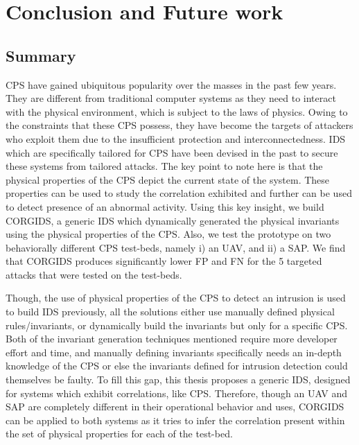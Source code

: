 
\chapter{\textbf{Conclusion and Future work}}
\label{sec8:Conclusion}

\section{Summary}

\ac{CPS} have gained ubiquitous popularity over the masses in the past few years. They are different from traditional computer systems as they need to interact with the physical environment, which is subject to the laws of physics. Owing to the constraints that these \ac{CPS} possess, they have become the targets of attackers who exploit them due to the insufficient protection and interconnectedness. \ac{IDS} which are specifically tailored for \ac{CPS} have been devised in the past to secure these systems from tailored attacks. The key point to note here is that the physical properties of the \ac{CPS} depict the current state of the system. These properties can be used to study the correlation exhibited and further can be used to detect presence of an abnormal activity. Using this key insight, we build \acf{CORGIDS}, a generic \ac{IDS} which dynamically generated the physical invariants using the physical properties of the \ac{CPS}. Also, we test the prototype on two behaviorally different \ac{CPS} test-beds, namely i) an \ac{UAV}, and ii) a \acf{SAP}. We find that \ac{CORGIDS} produces significantly lower \ac{FP} and \ac{FN} for the 5 targeted attacks that were tested on the test-beds.

Though, the use of physical properties of the \ac{CPS} to detect an intrusion is used to build \ac{IDS} previously, all the solutions either use manually defined physical rules/invariants, or dynamically build the invariants but only for a specific \ac{CPS}. Both of the invariant generation techniques mentioned require more developer effort and time, and manually defining invariants specifically needs an in-depth knowledge of the \ac{CPS} or else the invariants defined for intrusion detection could themselves be faulty. To fill this gap, this thesis proposes a generic \ac{IDS}, designed for systems which exhibit correlations, like \ac{CPS}. Therefore, though an \ac{UAV} and \ac{SAP} are completely different in their operational behavior and uses, \ac{CORGIDS} can be applied to both systems as it tries to infer the correlation present within the set of physical properties for each of the test-bed.
 
